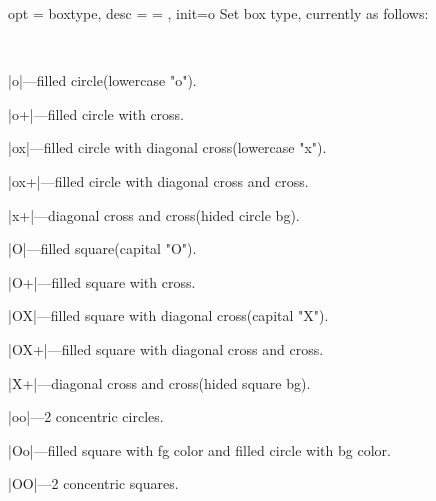 \documentclass[full]{l3doc}
\begin{document}
\begin{documentation}
\begin{option}{ opt = boxtype, desc = {= }, init=o }
  Set box type, currently as follows:
\end{option}\\
  \begin{Description}
    \item |o|---filled circle(lowercase "o").
    \item |o+|---filled circle with cross.
    \item |ox|---filled circle with diagonal cross(lowercase "x").
    \item |ox+|---filled circle with diagonal cross and cross.
    \item |x+|---diagonal cross and cross(hided circle bg).
    \item |O|---filled square(capital "O").
    \item |O+|---filled square with cross.
    \item |OX|---filled square with diagonal cross(capital "X").
    \item |OX+|---filled square with diagonal cross and cross.
    \item |X+|---diagonal cross and cross(hided square bg).
    \item |oo|---2 concentric circles.
    \item |Oo|---filled square with fg color and filled circle with bg color.
    \item |OO|---2 concentric squares.
  \end{Description}
\begin{SideBySideExample}[frame=single,numbers=left,xrightmargin=.50\linewidth,gobble=2]
  \centering
  \quad
  \quad
  \quad
  \quad
\end{SideBySideExample}

\begin{SideBySideExample}[frame=single,numbers=left,xrightmargin=.50\linewidth,gobble=2]
  \centering
  \quad
  \quad
  \quad
  \quad
\end{SideBySideExample}

\begin{SideBySideExample}[frame=single,numbers=left,xrightmargin=.50\linewidth,gobble=2]
  \centering
  \quad
  \quad
  \quad
  \quad
  \quad
\end{SideBySideExample}


\end{documentation}
\end{document}
